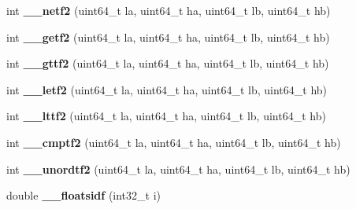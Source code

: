 \begin{DoxyCompactItemize}
\item 
\mbox{\label{classaacio_1_1chain_1_1compiler__builtins_a78fbb936cf0875de11188e8a76c2d72c}} 
int {\bfseries \+\_\+\+\_\+netf2} (uint64\+\_\+t la, uint64\+\_\+t ha, uint64\+\_\+t lb, uint64\+\_\+t hb)
\item 
\mbox{\label{classaacio_1_1chain_1_1compiler__builtins_a62cb697ed5e88276cff20cafcb20aa41}} 
int {\bfseries \+\_\+\+\_\+getf2} (uint64\+\_\+t la, uint64\+\_\+t ha, uint64\+\_\+t lb, uint64\+\_\+t hb)
\item 
\mbox{\label{classaacio_1_1chain_1_1compiler__builtins_ab826632566a221e3da47982606678b3f}} 
int {\bfseries \+\_\+\+\_\+gttf2} (uint64\+\_\+t la, uint64\+\_\+t ha, uint64\+\_\+t lb, uint64\+\_\+t hb)
\item 
\mbox{\label{classaacio_1_1chain_1_1compiler__builtins_ad52c47ee55714ebe658cb9580f732afa}} 
int {\bfseries \+\_\+\+\_\+letf2} (uint64\+\_\+t la, uint64\+\_\+t ha, uint64\+\_\+t lb, uint64\+\_\+t hb)
\item 
\mbox{\label{classaacio_1_1chain_1_1compiler__builtins_adbc4e897452cbf00b7eb8cff79c728b0}} 
int {\bfseries \+\_\+\+\_\+lttf2} (uint64\+\_\+t la, uint64\+\_\+t ha, uint64\+\_\+t lb, uint64\+\_\+t hb)
\item 
\mbox{\label{classaacio_1_1chain_1_1compiler__builtins_ad3d6427c7e6a66c4e30d625e83bfa2bd}} 
int {\bfseries \+\_\+\+\_\+cmptf2} (uint64\+\_\+t la, uint64\+\_\+t ha, uint64\+\_\+t lb, uint64\+\_\+t hb)
\item 
\mbox{\label{classaacio_1_1chain_1_1compiler__builtins_a372b6b60d15ca3077227b3d7a91996f4}} 
int {\bfseries \+\_\+\+\_\+unordtf2} (uint64\+\_\+t la, uint64\+\_\+t ha, uint64\+\_\+t lb, uint64\+\_\+t hb)
\item 
\mbox{\label{classaacio_1_1chain_1_1compiler__builtins_a5b6baa4329a2b51e4d70bdbf0ed1b061}} 
double {\bfseries \+\_\+\+\_\+floatsidf} (int32\+\_\+t i)

\end{DoxyCompactItemize}
